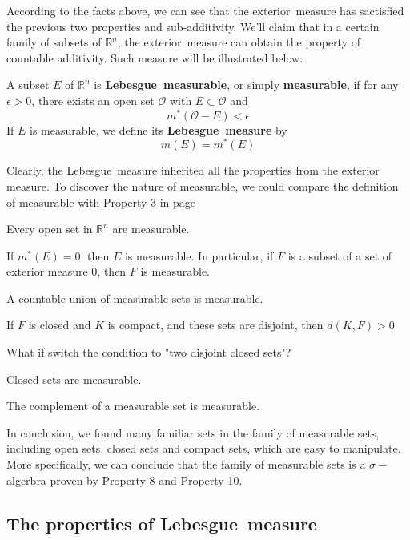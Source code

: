 \documentclass{ctexbook}
\begin{document}
According to the facts above, we can see that the exterior~measure has sactisfied the previous two properties and sub-additivity.
We'll claim that in a certain family of subsets of $\mathbb{R}^n$, the exterior~measure can obtain the property of countable
additivity. Such measure will be illustrated below:

\begin{define}
    A subset $E$ of $\mathbb{R}^n$ is \textbf{Lebesgue~measurable}, or simply \textbf{measurable}, if for any $\epsilon>0$,
    there exists an open set $\mathcal{O} $ with $E \subset \mathcal{O} $ and 
    \[m^*(\mathcal{O} - E) < \epsilon\]
    If $E$ is measurable, we define its \textbf{Lebesgue~measure} by \[m(E)=m^*(E)\]
\end{define}
Clearly, the Lebesgue~measure inherited all the properties from the exterior measure. To discover the nature of measurable,
we could compare the definition of measurable with Property 3 in page \pageref{sec exterior measure:open set}

\begin{prop}
    Every open set in $\mathbb{R}^n$ are measurable.
\end{prop}
\begin{prop}
    If $m^*(E)=0$, then $E$ is measurable. In particular, if $F$ is a subset of a set of exterior measure 0, then $F$ is measurable.
\end{prop}
\begin{prop}
    A countable union of measurable sets is measurable.
\end{prop}
\begin{lema}
    If $F$ is closed and $K$ is compact, and these sets are disjoint, then $d(K,F)>0$
\end{lema}
\noindent What if switch the condition to "two disjoint closed sets"?
\begin{prop}
    Closed sets are measurable.
\end{prop}
\begin{prop}
    The complement of a measurable set is measurable.
\end{prop}
In conclusion, we found many familiar sets in the family of measurable sets, including open sets, closed sets and compact sets,
which are easy to manipulate. More specifically, we can conclude that the family of measurable sets is a $\sigma-$algerbra proven
by Property 8 and Property 10.

\subsection*{The properties of Lebesgue~measure}
\end{document}
